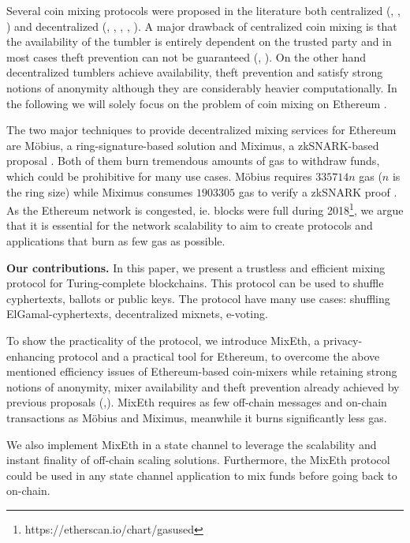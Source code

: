 \documentclass[a4paper]{article}
\theoremstyle{definition}
\begin{document}
Several coin mixing protocols were proposed in the literature both centralized (\cite{bonneau2014mixcoin}, \cite{valenta2015blindcoin}, \cite{heilman2017tumblebit}) and decentralized (\cite{maxwell2013coinjoin}, \cite{ruffing2014coinshuffle}, \cite{miximus2018}, \cite{meiklejohn2018mobius}, \cite{bissias2014sybil}). A major drawback of centralized coin mixing is that the availability of the tumbler is entirely dependent on the trusted party and in most cases theft prevention can not be guaranteed (\cite{bonneau2014mixcoin}, \cite{valenta2015blindcoin}). On the other hand decentralized tumblers achieve availability, theft prevention and satisfy strong notions of anonymity although they are considerably heavier computationally. In the following we will solely focus on the problem of coin mixing on Ethereum \cite{wood2014ethereum}. 

The two major techniques to provide decentralized mixing services for Ethereum are Möbius, a ring-signature-based solution \cite{meiklejohn2018mobius} and Miximus, a zkSNARK-based proposal \cite{miximus2018}. Both of them burn tremendous amounts of gas to withdraw funds, which could be prohibitive for many use cases. Möbius requires $\num[group-separator={,}]{335714}n$ gas ($n$ is the ring size) while Miximus consumes $\num[group-separator={,}]{1903305}$ gas to verify a zkSNARK proof \cite{miximus2018gascost}. As the Ethereum network is congested, ie. blocks were full during 2018\footnote{https://etherscan.io/chart/gasused}, we argue that it is essential for the network scalability to aim to create protocols and applications that burn as few gas as possible. 

\textbf{Our contributions.} In this paper, we present a trustless and efficient mixing protocol for Turing-complete blockchains. This protocol can be used to shuffle cyphertexts, ballots or public keys. The protocol have many use cases: shuffling ElGamal-cyphertexts, decentralized mixnets, e-voting.

To show the practicality of the protocol, we introduce MixEth, a privacy-enhancing protocol and a practical tool for Ethereum, to overcome the above mentioned efficiency issues of Ethereum-based coin-mixers while retaining strong notions of anonymity, mixer availability and theft prevention already achieved by previous proposals (\cite{meiklejohn2018mobius},\cite{miximus2018}). MixEth requires as few off-chain messages and on-chain transactions as Möbius and Miximus, meanwhile it burns significantly less gas.

We also implement MixEth in a state channel to leverage the scalability and instant finality of off-chain scaling solutions. Furthermore, the MixEth protocol could be used in any state channel application to mix funds before going back to on-chain. 
\end{document}
